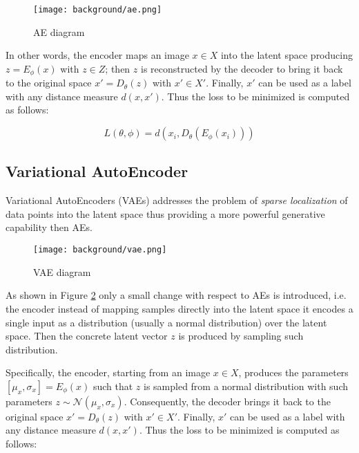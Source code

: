 \begin{figure}[h]
  \begin{center}
    \texttt{[image: background/ae.png]}
  \end{center}
  \caption{AE diagram}
  \label{fig:ae}
\end{figure}

In other words, the encoder maps an image $x\in X$ into the latent space producing ${z=E_{\phi }(x)}$ with $z\in Z$; then $z$ is reconstructed by the decoder to bring it back to the original space ${x'=D_{\theta }(z)}$ with $x'\in X'$. Finally, $x'$ can be used as a label with any distance measure $d(x,x')$. Thus the loss to be minimized is computed as follows:

\begin{equation}
\label{eq:aeloss}
  L(\theta ,\phi ) = d(x_{i},D_{\theta }(E_{\phi }(x_{i})))
\end{equation}

\subsection{Variational AutoEncoder}

Variational AutoEncoders (VAEs) addresses the problem of \textit{sparse localization} of data points into the latent space thus providing a more powerful generative capability then AEs.

\begin{figure}[h]
  \begin{center}
    \texttt{[image: background/vae.png]}
  \end{center}
  \caption{VAE diagram}
  \label{fig:vae}
\end{figure}

As shown in Figure \ref{fig:vae} only a small change with respect to AEs is introduced, i.e. the encoder instead of mapping samples directly into the latent space it encodes a single input as a distribution (usually a normal distribution) over the latent space. Then the concrete latent vector $z$ is produced by sampling such distribution. 

Specifically, the encoder, starting from an image $x\in X$, produces the parameters ${[\mu_x, \sigma_x]=E_{\phi }(x)}$ such that $z$ is sampled from a normal distribution with such parameters $z \sim \mathcal{N}(\mu_x, \sigma_x)$. Consequently, the decoder brings it back to the original space ${x'=D_{\theta }(z)}$ with $x'\in X'$. Finally, $x'$ can be used as a label with any distance measure $d(x,x')$. Thus the loss to be minimized is computed as follows:

